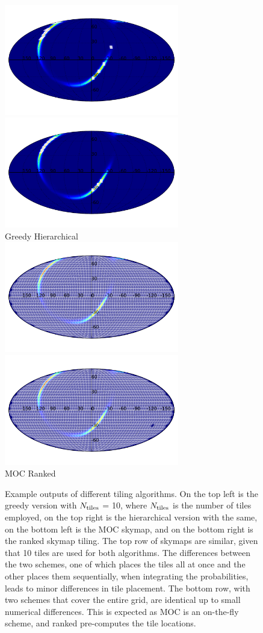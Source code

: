 \documentclass[twocolumn]{aastex62}
\begin{document}
\begin{figure}[t]
    \centering
    \includegraphics[width=3in]{tiling_greedy}
    \includegraphics[width=3in]{tiling_hierarchical} \\
    Greedy \hspace{2.6in}Hierarchical\\
    \includegraphics[width=3in]{tiling_moc}
    \includegraphics[width=3in]{tiling_ranked} \\
    MOC \hspace{2.6in}Ranked
    \caption{Example outputs of different tiling algorithms. On the top left is the greedy version with $N_{\rm tiles}$ = 10, where $N_{\rm tiles}$ is the number of tiles employed, on the top right is the hierarchical version with the same, on the bottom left is the MOC skymap, and on the bottom right is the ranked skymap tiling. The top row of skymaps are similar, given that 10 tiles are used for both algorithms. The differences between the two schemes, one of which places the tiles all at once and the other places them sequentially, when integrating the probabilities, leads to minor differences in tile placement. The bottom row, with two schemes that cover the entire grid, are identical up to small numerical differences. This is expected as MOC is an on-the-fly scheme, and ranked pre-computes the tile locations.}

\end{figure}
\end{document}
